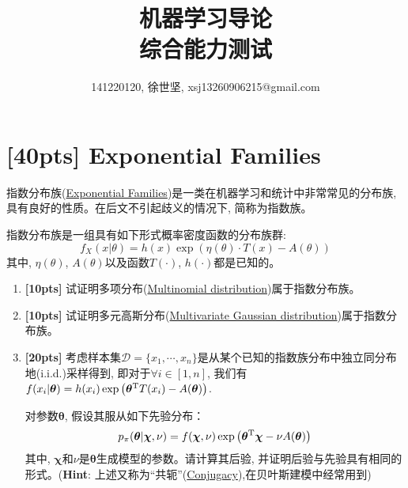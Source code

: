 \documentclass[a4paper,UTF8]{article}
\numberwithin{equation}{section}
\theoremstyle{definition}
\begin{document}
\title{机器学习导论\\
综合能力测试}
\author{141220120, 徐世坚, xsj13260906215@gmail.com}
\maketitle
\section{[40pts] Exponential Families}
\label{Exponential Families}
指数分布族(\href{https://en.wikipedia.org/wiki/Exponential_family}{Exponential Families})是一类在机器学习和统计中非常常见的分布族, 具有良好的性质。在后文不引起歧义的情况下, 简称为指数族。

指数分布族是一组具有如下形式概率密度函数的分布族群:
\begin{equation}
f_X(x|\theta) = h(x) \exp \left(\eta(\theta) \cdot T(x) -A(\theta)\right)
\end{equation}  
其中, $\eta(\theta)$, $A(\theta)$以及函数$T(\cdot)$, $h(\cdot)$都是已知的。
\begin{enumerate}[(1)]
\item \textbf{[10pts]} 试证明多项分布(\href{https://en.wikipedia.org/wiki/Multinomial_distribution}{Multinomial distribution})属于指数分布族。

\item \textbf{[10pts]} 试证明多元高斯分布(\href{https://en.wikipedia.org/wiki/Multivariate_normal_distribution}{Multivariate Gaussian distribution})属于指数分布族。

\item \textbf{[20pts]} 考虑样本集$\mathcal{D}=\{ x_1,\cdots, x_n\}$是从某个已知的指数族分布中独立同分布地(i.i.d.)采样得到, 即对于$\forall i\in [1,n]$, 我们有$f( x_i|\boldsymbol\theta) = h(x_i) \exp \left ( {\boldsymbol\theta}^{\rm T}T(x_i) -A(\boldsymbol\theta)\right)$. 

对参数$\boldsymbol\theta$, 假设其服从如下先验分布：
\begin{equation}
p_\pi(\boldsymbol\theta|\boldsymbol\chi,\nu) = f(\boldsymbol\chi,\nu) \exp \left (\boldsymbol\theta^{\rm T} \boldsymbol\chi - \nu A(\boldsymbol\theta) \right )
\end{equation}
其中, $\boldsymbol\chi$和$\nu$是$\boldsymbol\theta$生成模型的参数。请计算其后验, 并证明后验与先验具有相同的形式。(\textbf{Hint}: 上述又称为“共轭”(\href{https://people.eecs.berkeley.edu/~jordan/courses/260-spring10/other-readings/chapter9.pdf}{Conjugacy}),在贝叶斯建模中经常用到)
\end{enumerate}
\end{document}
